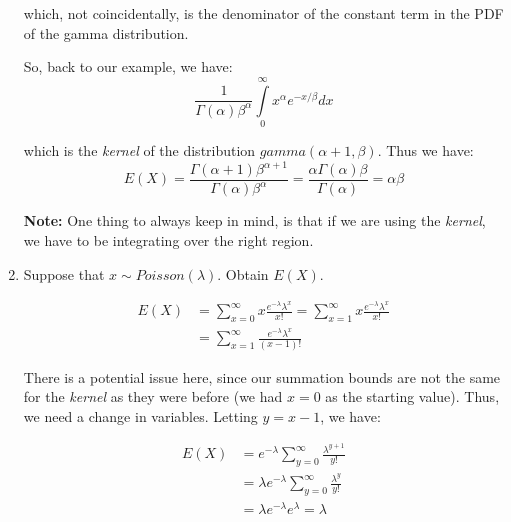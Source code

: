 \documentclass{article}
\begin{document}
\begin{enumerate}
    which, not coincidentally, is the denominator of the constant term in the PDF of the gamma distribution. 
    
    So, back to our example, we have:
    \begin{equation*}
        \frac{1}{\Gamma(\alpha)\beta^\alpha} \int\limits_0^\infty x^{\alpha}e^{-x/\beta}dx
    \end{equation*}
    
    which is the \textit{kernel} of the distribution $gamma(\alpha+1,\beta)$. Thus we have:
    \begin{equation*}
        E(X) = \frac{\Gamma(\alpha+1)\beta^{\alpha+1}}{\Gamma(\alpha)\beta^{\alpha}} = \frac{\alpha \Gamma(\alpha)\beta}{\Gamma(\alpha)} = \alpha\beta
    \end{equation*}
    
    \textbf{Note:} One thing to always keep in mind, is that if we are using the \textit{kernel}, we have to be integrating over the right region. 
    
    \item Suppose that $x\sim Poisson(\lambda)$. Obtain $E(X).$
    
    \begin{equation*}
        \begin{split}
            E(X) &= \sum\limits_{x=0}^\infty x \frac{e^{-\lambda}\lambda^x}{x!} = \sum\limits_{x=1}^\infty x \frac{e^{-\lambda}\lambda^x}{x!}\\
            &= \sum\limits_{x=1}^\infty \frac{e^{-\lambda}\lambda^x}{(x-1)!}
        \end{split}
    \end{equation*}
    
    There is a potential issue here, since our summation bounds are not the same for the \textit{kernel} as they were before (we had $x=0$ as the starting value). Thus, we need a change in variables. Letting $y=x-1$, we have:
    
    \begin{equation*}
        \begin{split}
            E(X) &= e^{-\lambda} \sum\limits_{y=0}^\infty \frac{\lambda^{y+1}}{y!}\\
            &= \lambda e^{-\lambda} \sum\limits_{y=0}^\infty \frac{\lambda^{y}}{y!}\\
            &= \lambda e^{-\lambda} e^{\lambda} = \lambda
        \end{split}
    \end{equation*}
\end{enumerate}
\end{document}
